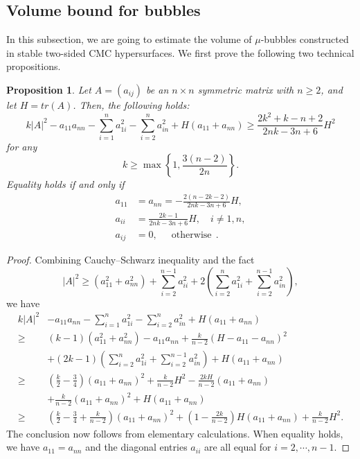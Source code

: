 \documentclass[11pt,letterpaper]{amsart}
\newtheorem{proposition}[theorem]{Proposition}
\theoremstyle{definition}
\theoremstyle{remark}
\numberwithin{equation}{section}
\begin{document}
\subsection{Volume bound for bubbles}
In this subsection, we are going to estimate the volume of $\mu$-bubbles constructed in stable two-sided CMC hypersurfaces. We first prove the following two technical propositions.
\begin{proposition}\label{inequalityforAsquare}
    Let $A=(a_{ij})$ be an $n\times n$ symmetric matrix with $n\geq 2$, and let $H=tr(A)$. Then, the following holds:
    \[k|A|^2-a_{11}a_{nn}-\sum_{i=1}^{n}a_{1i}^2-\sum_{i=2}^na_{in}^2+H(a_{11}+a_{nn})\geq \frac{2k^2+k-n+2}{2nk-3n+6}H^2\]
    for any 
    \begin{equation}\label{assumption for k and alpha=1}
    k\geq \max\left\{1,\frac{3(n-2)}{2n}\right\}.
    \end{equation}
    Equality holds if and only if
    \begin{equation*}
        \begin{split}
            a_{11}&=a_{nn}=-\frac{2(n-2k-2)}{2nk-3n+6}H,\\ a_{ii}&=\frac{2k-1}{2nk-3n+6}H, \quad  i\neq 1,n,\\
    a_{ij}&=0, \quad ~~\mbox{otherwise}~~.
        \end{split}
    \end{equation*}
\end{proposition}
\begin{proof}
Combining Cauchy--Schwarz inequality and the fact 
\[|A|^2\geq (a_{11}^2+a_{nn}^2)+\sum_{i=2}^{n-1}a_{ii}^2+2(\sum_{i=2}^na_{1i}^2+\sum_{i=2}^{n-1}a_{in}^2),\]
we have
\begin{align*}
    k|A|^2&-a_{11}a_{nn}-\sum_{i=1}^{n}a_{1i}^2-\sum_{i=2}^na_{in}^2+H(a_{11}+a_{nn})\\
    \geq &(k-1)(a_{11}^2+a_{nn}^2)-a_{11}a_{nn}+\frac{k}{n-2}(H-a_{11}-a_{nn})^2\\
    &+(2k-1)(\sum_{i=2}^na_{1i}^2+\sum_{i=2}^{n-1}a_{in}^2)+H(a_{11}+a_{nn})\\
    \geq &\left(\frac{k}{2}-\frac{3}{4}\right)(a_{11}+a_{nn})^2+\frac{k}{n-2}H^2-\frac{2kH}{n-2}(a_{11}+a_{nn})\\
    &+\frac{k}{n-2}(a_{11}+a_{nn})^2+H(a_{11}+a_{nn})\\
    \geq &\left(\frac{k}{2}-\frac{3}{4}+\frac{k}{n-2}\right)(a_{11}+a_{nn})^2+\left(1-\frac{2k}{n-2}\right)H(a_{11}+a_{nn})+\frac{k}{n-2}H^2.
\end{align*}
The conclusion now follows from elementary calculations. When equality holds, we have $a_{11}=a_{nn}$ and the diagonal entries $a_{ii}$ are all equal for $i=2,\cdots,n-1$.
\end{proof}
\end{document}
